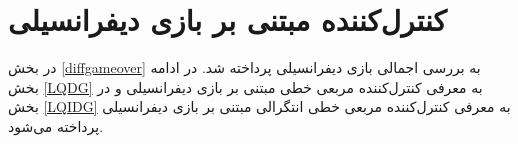 \section{کنترل‌کننده مبتنی بر بازی دیفرانسیلی}\label{diffgamecontroller}
در بخش
\ref{diffgameover}
به بررسی اجمالی بازی دیفرانسیلی پرداخته شد. در ادامه بخش
\ref{LQDG}
به معرفی
کنترل‌کننده مربعی خطی مبتنی بر بازی دیفرانسیلی
و در بخش
\ref{LQIDG}
به معرفی
کنترل‌کننده مربعی خطی انتگرالی مبتنی بر بازی دیفرانسیلی
پرداخته می‌شود.